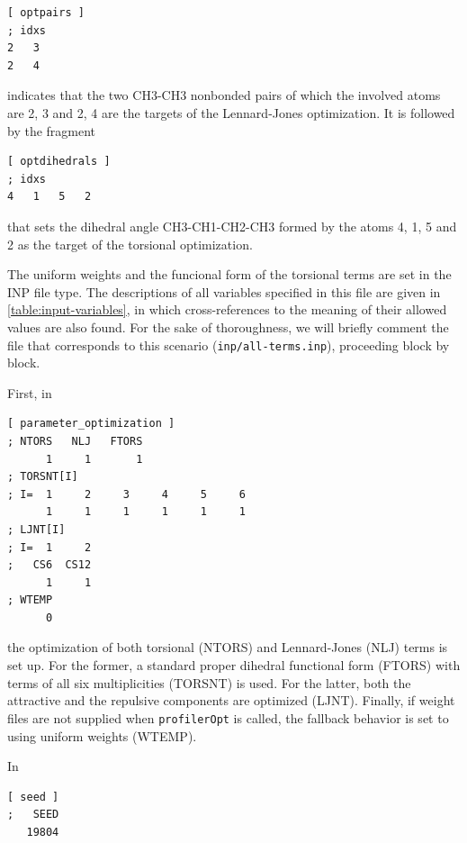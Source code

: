 \documentclass[10pt,a4paper]{report}
\numberwithin{equation}{section}
\newcommand{\profileropt}[0]{\texttt{profilerOpt}}
\begin{document}
\begin{lstlisting}[language=gromacs]
[ optpairs ]
; idxs
2   3
2   4
\end{lstlisting}\vspace{-2ex}\par

\noindent indicates that the two CH3-CH3 nonbonded pairs of which the
involved atoms are 2, 3 and 2, 4 are the targets of the Lennard-Jones
optimization. It is followed by the fragment
%

\begin{lstlisting}[language=gromacs]
[ optdihedrals ]
; idxs
4   1   5   2   
\end{lstlisting}\vspace{-2ex}\par

\noindent that sets the dihedral angle CH3-CH1-CH2-CH3 formed by the
atoms 4, 1, 5 and 2 as the target of the torsional optimization.

The uniform weights and the funcional form of the torsional terms are
set in the INP file type.
%
The descriptions of all variables specified in this file are given in
\autoref{table:input-variables}, in which cross-references to the
meaning of their allowed values are also found.
%
For the sake of thoroughness, we will briefly comment the file that
corresponds to this scenario (\texttt{inp/all-terms.inp}), proceeding
block by block.

First, in

\begin{lstlisting}[language=gromacs]
[ parameter_optimization ]
; NTORS   NLJ   FTORS
      1     1       1    
; TORSNT[I]
; I=  1     2     3     4     5     6
      1     1     1     1     1     1
; LJNT[I]
; I=  1     2
;   CS6  CS12
      1     1
; WTEMP
      0
\end{lstlisting}\vspace{-2ex}\par

\noindent the optimization of both torsional (NTORS) and
Lennard-Jones (NLJ) terms is set up.
%
For the former, a standard proper dihedral functional form (FTORS)
with terms of all six multiplicities (TORSNT) is used.
%
For the latter, both the attractive and the repulsive components are
optimized (LJNT).
%
Finally, if weight files are not supplied when \profileropt{} is
called, the fallback behavior is set to using uniform weights (WTEMP).

In

\begin{lstlisting}[language=gromacs]
[ seed ]
;   SEED
   19804
\end{lstlisting}\vspace{-2ex}\par
\end{document}
